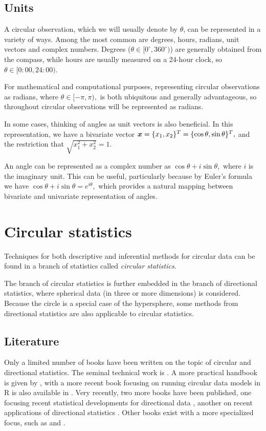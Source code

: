 \documentclass[12pt, a4paper]{book}\usepackage[]{graphicx}\usepackage[]{color}
\begin{document}
\subsection{Units}

A circular observation, which we will usually denote by $\theta$, can be represented in a variety of ways. Among the most common are degrees, hours, radians, unit vectors and complex numbers. Degrees ($\theta \in [0^\circ, 360^\circ)$) are generally obtained from the compass, while hours are usually measured on a 24-hour clock, so $\theta \in [0:00, 24:00)$.

For mathematical and computational purposes, representing circular observations as radians, where $\theta \in [-\pi, \pi),$ is both ubiquitous and generally advantageous, so throughout circular observations will be represented as radians.

In some cases, thinking of angles as unit vectors is also beneficial. In this representation, we have a bivariate vector $\boldsymbol{x} = \{x_1, x_2\}^T = \{\cos\theta, \sin\theta\}^T,$ and the restriction that $\sqrt{x_1^2 + x_2^2} = 1.$

An angle can be represented as a complex number as $\cos\theta + i \sin \theta,$ where $i$ is the imaginary unit. This can be useful, particularly because by Euler's formula we have $\cos\theta + i \sin \theta = e^{i\theta},$ which provides a natural mapping between bivariate and univariate representation of angles.




\section{Circular statistics}

Techniques for both descriptive and inferential methods for circular data can be found in a branch of statistics called \textit{circular statistics}.

The branch of circular statistics is further embedded in the branch of directional statistics, where spherical data (in three or more dimensions) is considered. Because the circle is a special case of the hypersphere, some methods from directional statistics are also applicable to circular statistics.

\subsection{Literature}

Only a limited number of books have been written on the topic of circular and directional statistics. The seminal technical work is \citet{mardia2009directional}. A more practical handbook is given by \citet{fisher1995statistical}, with a more recent book focusing on running circular data models in R is also available in \citet{pewsey2013circular}. Very recently, two more books have been published, one focusing recent statistical developments for directional data \citep{ley2017modern}, another on recent applications of directional statistics \citep{ley2018applied}. Other books exist with a more specialized focus, such as \citet{batschelet1981circular} and \citet{jammalamadaka2001topics}.
\end{document}
